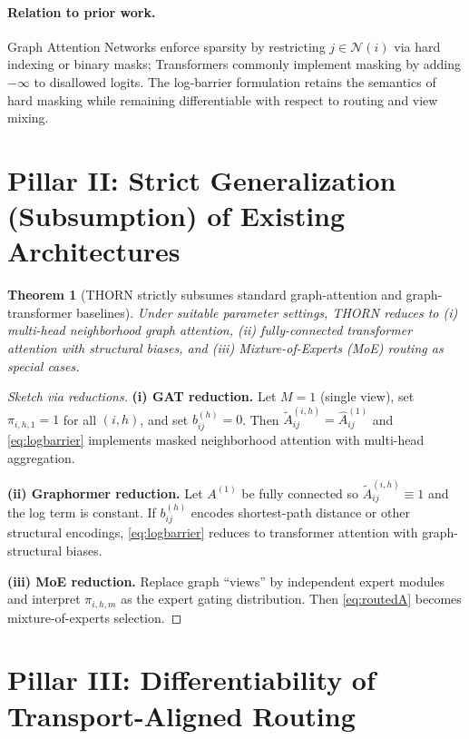 \documentclass[11pt]{article}
\newtheorem{theorem}{Theorem}
\begin{document}
\paragraph{Relation to prior work.}
Graph Attention Networks enforce sparsity by restricting $j\in\mathcal{N}(i)$ via hard indexing or binary masks; Transformers commonly implement masking by adding $-\infty$ to disallowed logits. The log-barrier formulation retains the semantics of hard masking while remaining differentiable with respect to routing and view mixing.

\section{Pillar II: Strict Generalization (Subsumption) of Existing Architectures}

\begin{theorem}[THORN strictly subsumes standard graph-attention and graph-transformer baselines]
\label{thm:subsumption}
Under suitable parameter settings, THORN reduces to (i) multi-head neighborhood graph attention, (ii) fully-connected transformer attention with structural biases, and (iii) Mixture-of-Experts (MoE) routing as special cases.
\end{theorem}

\begin{proof}[Sketch via reductions]
\textbf{(i) GAT reduction.} Let $M=1$ (single view), set $\pi_{i,h,1}=1$ for all $(i,h)$, and set $b_{ij}^{(h)}=0$. Then $\tilde A_{ij}^{(i,h)}=\hat A_{ij}^{(1)}$ and \eqref{eq:logbarrier} implements masked neighborhood attention with multi-head aggregation.

\textbf{(ii) Graphormer reduction.} Let $A^{(1)}$ be fully connected so $\tilde A_{ij}^{(i,h)}\equiv 1$ and the log term is constant. If $b_{ij}^{(h)}$ encodes shortest-path distance or other structural encodings, \eqref{eq:logbarrier} reduces to transformer attention with graph-structural biases.

\textbf{(iii) MoE reduction.} Replace graph ``views'' by independent expert modules and interpret $\pi_{i,h,m}$ as the expert gating distribution. Then \eqref{eq:routedA} becomes mixture-of-experts selection.
\end{proof}

\section{Pillar III: Differentiability of Transport-Aligned Routing}
\end{document}
